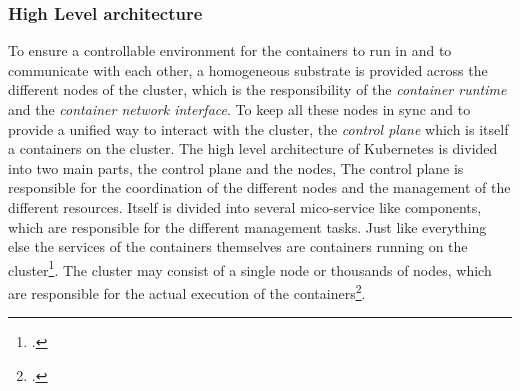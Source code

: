 \subsubsection{High Level architecture}
To ensure a controllable environment for the containers to run in and to communicate with each other, a homogeneous substrate
is provided across the different nodes of the cluster, which is the responsibility of the \textit{container runtime} and the \textit{container network interface}.
To keep all these nodes in sync and to provide a unified way to interact with the cluster, the \textit{control plane} which is itself a containers on the cluster.
The high level architecture of Kubernetes is divided into two main parts, the control plane and the nodes,
The control plane is responsible for the coordination of the different nodes and the management of the different resources.
Itself is divided into several \gls{mico-service} like components, which are responsible for the different management tasks.
Just like everything else the services of the containers themselves are containers running on the cluster\footcite{kubernetes-docsKubernetesComponents}.
The cluster may consist of a single node or thousands of nodes, which are responsible for the actual execution of the containers\footcite{kubernetes-docsNodes}.


